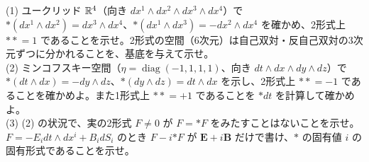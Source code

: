 \begin{problem}[難易度 A]\label{ch05-prob-star}
(1) ユークリッド $\mathbb{R}^4$（向き $dx^1\wedge dx^2\wedge dx^3\wedge dx^4$）で ${*}(dx^1\wedge dx^2)=dx^3\wedge dx^4$、${*}(dx^1\wedge dx^3)=-dx^2\wedge dx^4$ を確かめ、2形式上 ${**}=1$ であることを示せ。2形式の空間（6次元）は自己双対・反自己双対の3次元ずつに分かれることを、基底を与えて示せ。\\
(2) ミンコフスキー空間（$\eta=\operatorname{diag}(-1,1,1,1)$、向き $dt\wedge dx\wedge dy\wedge dz$）で ${*}(dt\wedge dx)=-dy\wedge dz$、${*}(dy\wedge dz)=dt\wedge dx$ を示し、2形式上 ${**}=-1$ であることを確かめよ。また1形式上 ${**}=+1$ であることを ${*}dt$ を計算して確かめよ。\\
(3) (2) の状況で、実の2形式 $F\neq0$ が $F={*F}$ をみたすことはないことを示せ。$F=-E_idt\wedge dx^i+B_idS_i$ のとき $F-i{*F}$ が $\bm E+i\bm B$ だけで書け、${*}$ の固有値 $i$ の固有形式であることを示せ。
\end{problem}


